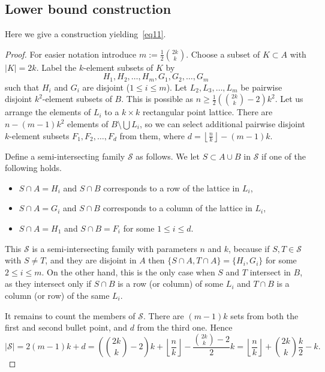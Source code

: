 \documentclass[12pt,a4paper]{amsart}
\numberwithin{equation}{section}
\theoremstyle{plain}
\theoremstyle{definition}
\newcommand{\m}{\mathcal}
\newcommand{\trivup}{\left\lfloor\frac{n}{k}\right\rfloor}
\newcommand{\NN}{n}
\begin{document}
\subsection{Lower bound construction} \label{ss_lowerboundconstruction} Here we give a construction yielding~\eqref{eq11}.
\begin{proof}
For easier notation introduce $m:=\frac{1}{2}\binom{2k}{k}$. Choose a subset of $K \subset A$ with $|K|=2k$. Label the $k$-element subsets of $K$ by
  $$H_1, H_2, \ldots, H_{m}, G_1, G_2, \ldots, G_{m}$$ such that $H_i$ and $G_i$ are disjoint ($1 \leq i \leq m$).
Let $L_2, L_3, \ldots,  L_m$ be pairwise disjoint $k^2$-element subsets of $B$. This is possible as $\NN\geq \frac{1}{2}\left(\binom{2k}{k}-2\right) k^2$. Let us arrange the elements of $L_i$ to a $k\times k$ rectangular point lattice.
There are $n-(m-1)k^2$ elements of $B\setminus \bigcup L_i$, so we can select additional pairwise disjoint $k$-element subsets $F_1,F_2,\ldots,F_d$ from them, where $d=\left\lfloor\frac{\NN}{k}\right\rfloor-(m-1)k.$

Define a semi-intersecting family $\m{S}$ as follows. We let $S\subset A \cup B$ in $\m{S}$ if one of the following holds.
\begin{itemize}
    \item $S \cap A=H_i$ and $S \cap B$ corresponds to a row of the lattice in $L_i$, %
    \item $S \cap A=G_i$ and $S \cap B$ corresponds to a column of the lattice in $L_i$, %
    \item $S \cap A=H_1$ and $S \cap B=F_i$ for some $1 \leq i \leq d$.
\end{itemize}

This $\m{S}$ is a semi-intersecting family with parameters $\NN$ and $k$, because if $S,T \in \m{S}$ with $S \neq T$, and they are disjoint in $A$ then $\{S \cap A, T \cap A\}=\{H_i, G_i\}$ for some $2 \leq i \leq m$. On the other hand, this is the only case when $S$ and $T$ intersect in $B$, as they intersect only if $S \cap B$ is a row (or column) of some $L_i$ and $T \cap B$ is a column (or row) of the same $L_i$.

It remains to count the members of $\m{S}$. There are $(m-1)k$ sets from both the first and second bullet point, and $d$ from the third one.
Hence $$|\m{S}|=2(m-1)k+d=\left(\binom{2k}{k}-2\right)k+\trivup - \frac{\binom{2k}{k}-2}{2}k
=\left\lfloor\frac{n}{k}\right\rfloor+\binom{2k}{k}\frac{k}{2}-k.$$
\end{proof}
\end{document}
